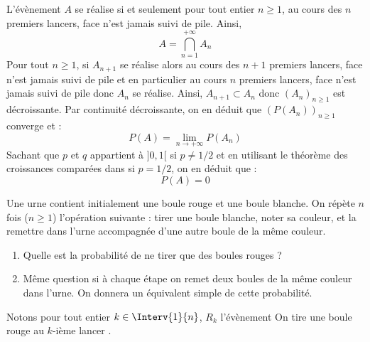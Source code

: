 \documentclass[a4paper,10pt]{report}
\begin{document}
\begin{enumerate}
\noindent L'évènement $A$ se réalise si et seulement pour tout entier $n \geq 1$, au cours des $n$ premiers lancers, face n'est jamais suivi de pile. Ainsi,
$$ A = \bigcap_{n=1}^{+ \infty} A_n$$
Pour tout $n \geq 1$, si $A_{n+1}$ se réalise alors au cours des $n+1$ premiers lancers, face n'est jamais suivi de pile et en particulier au cours $n$ premiers lancers, face n'est jamais suivi de pile donc $A_n$ se réalise. Ainsi, $A_{n+1} \subset A_n$ donc $(A_n)_{n \geq 1}$ est décroissante. Par continuité décroissante, on en déduit que $(P(A_n))_{n \geq 1}$ converge et :
$$ P(A) = \lim_{n \rightarrow + \infty} P(A_n)$$
Sachant que $p$ et $q$ appartient à $]0,1[$ si $p \neq 1/2$ et en utilisant le théorème des croissances comparées dans si $p=1/2$, on en déduit que :
$$ P(A)=0$$
\end{enumerate}

\begin{Exa} Une urne contient initialement une boule rouge et une boule blanche. On répète $n$ fois ($n \geq 1$) l'opération suivante : tirer une boule blanche, noter sa couleur, et la remettre dans l'urne accompagnée d'une autre boule de la même couleur. 

\begin{enumerate}
\item Quelle est la probabilité de ne tirer que des boules rouges ?
\item Même question si à chaque étape on remet deux boules de la même couleur dans l'urne. On donnera un équivalent simple de cette probabilité.
\end{enumerate}
\end{Exa} 

\corr Notons pour tout entier $k \in \Interv{1}{n}$, $R_k$ l'évènement \og On tire une boule rouge au $k$-ième lancer \fg.
\end{document}

